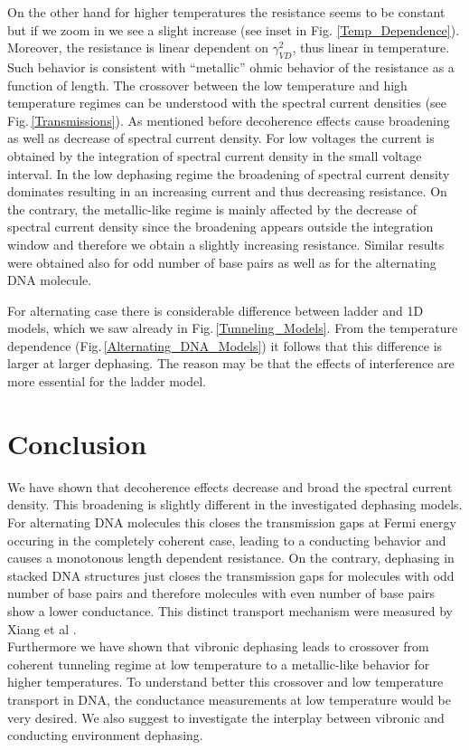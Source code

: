 \documentclass[reprint,superscriptaddress,nofootinbib,amsmath,amssymb,prb,floatfix]{revtex4-1}
\begin{document}
On the other hand for higher temperatures the resistance seems to be constant but if we zoom in we
see a slight increase (see inset in Fig. \ref{Temp_Dependence}). Moreover, the resistance is linear
dependent on $\gamma_{VD}^2$, thus linear in temperature. Such behavior is consistent with
``metallic'' ohmic behavior of the resistance as a function of length. The crossover between the low
temperature and high temperature regimes can be understood with the spectral current densities (see
Fig.\,\ref{Transmissions}). As mentioned before decoherence effects cause broadening as well as
decrease of spectral current density.  For low voltages the current is obtained by the integration
of spectral current density in the small voltage interval. In the low dephasing regime the
broadening of spectral current density dominates resulting in an increasing current and thus
decreasing resistance. On the contrary, the metallic-like regime is mainly affected by the decrease
of spectral current density since the broadening appears outside the integration window and
therefore we obtain a slightly increasing resistance.  Similar results were obtained also for odd
number of base pairs as well as for the alternating DNA molecule.

For alternating case there is considerable difference between ladder and 1D models, which we saw
already in Fig.\,\ref{Tunneling_Models}. From the temperature dependence
(Fig.\,\ref{Alternating_DNA_Models}) it follows that this difference is larger at larger
dephasing. The reason may be that the effects of interference are more essential for the ladder model.

\section{Conclusion}
\label{sec_conclusion}

We have shown that decoherence effects decrease and broad the spectral current density. This
broadening is slightly different in the investigated dephasing models. For alternating DNA molecules
this closes the transmission gaps at Fermi energy occuring in the completely coherent case, leading
to a conducting behavior and causes a monotonous length dependent resistance. On the contrary,
dephasing in stacked DNA structures just closes the transmission gaps for molecules with odd number
of base pairs and therefore molecules with even number of base pairs show
a lower conductance. This distinct transport mechanism were measured by Xiang et al \cite{xiang_intermediate_2015}.\\
Furthermore we have shown that vibronic dephasing leads to crossover from coherent tunneling regime
at low temperature to a metallic-like behavior for higher temperatures. To understand better this
crossover and low temperature transport in DNA, the conductance measurements at low temperature
would be very desired. We also suggest to investigate the interplay between vibronic and conducting
environment dephasing.
\end{document}
